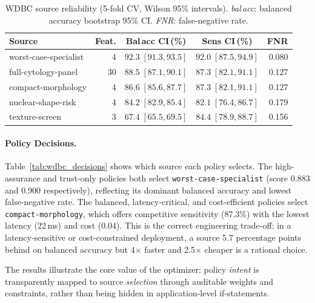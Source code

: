 \documentclass[runningheads]{llncs}
\begin{document}
\begin{table}[t]
\caption{WDBC source reliability (5-fold CV, Wilson 95\% intervals).
  \emph{bal\,acc}: balanced accuracy bootstrap 95\% CI.
  \emph{FNR}: false-negative rate.}
\label{tab:wdbc_sources}
\centering
\small
\begin{tabular}{lrccr}
\toprule
Source & Feat. & Bal\,acc CI\,(\%) & Sens CI\,(\%) & FNR\\
\midrule
worst-case-specialist  & 4  & $92.3\;[91.3,93.5]$ & $92.0\;[87.5,94.9]$ & 0.080\\
full-cytology-panel    & 30 & $88.5\;[87.1,90.1]$ & $87.3\;[82.1,91.1]$ & 0.127\\
compact-morphology     & 4  & $86.6\;[85.6,87.7]$ & $87.3\;[82.1,91.1]$ & 0.127\\
nuclear-shape-risk     & 4  & $84.2\;[82.9,85.4]$ & $82.1\;[76.4,86.7]$ & 0.179\\
texture-screen         & 3  & $67.4\;[65.5,69.5]$ & $84.4\;[78.9,88.7]$ & 0.156\\
\bottomrule
\end{tabular}
\end{table}

\paragraph{Policy Decisions.}
Table~\ref{tab:wdbc_decisions} shows which source each policy selects.
The high-assurance and trust-only policies both select
\texttt{worst-case-specialist} (score 0.883 and 0.900 respectively),
reflecting its dominant balanced accuracy and lowest false-negative rate.
The balanced, latency-critical, and cost-efficient policies select
\texttt{compact-morphology}, which offers competitive sensitivity (87.3\%)
with the lowest latency (22\,ms) and cost (0.04).  This is the correct
engineering trade-off: in a latency-sensitive or cost-constrained
deployment, a source 5.7 percentage points behind on balanced accuracy
but 4$\times$ faster and 2.5$\times$ cheaper is a rational choice.

The results illustrate the core value of the optimizer: policy
\emph{intent} is transparently mapped to source \emph{selection} through
auditable weights and constraints, rather than being hidden in
application-level if-statements.
\end{document}
